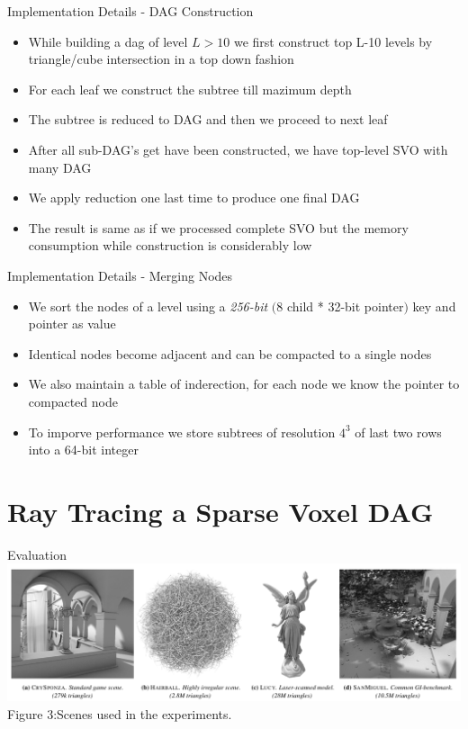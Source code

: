 \documentclass{beamer}
\begin{document}
\begin{frame}{Implementation Details - DAG Construction}
\begin{itemize}
\item{While building a dag of level $L>10$ we first construct top L-10 levels by triangle/cube intersection in a top down fashion}
\item{For each leaf we construct the subtree till mazimum depth}
\item{The subtree is reduced to DAG and then we proceed to next leaf}
\item{After all sub-DAG's get have been constructed, we have top-level SVO with many DAG}
\item{We apply reduction one last time to produce one final DAG}
\item{The result is same as if we processed complete SVO but the memory consumption while construction is considerably low}
\end{itemize}
\end{frame}

\begin{frame}{Implementation Details - Merging Nodes}
\begin{itemize}
\item{We sort the nodes of a level using a \textit{256-bit} $($8 child * 32-bit pointer$)$ key and pointer as value}
\item{Identical nodes become adjacent and can be compacted to a single nodes}
\item{We also maintain a table of inderection, for each node we know the pointer to compacted node}
\item{To imporve performance we store subtrees of resolution $4^3$ of last two rows into a 64-bit integer}
\end{itemize}
\end{frame}

\section{Ray Tracing a Sparse Voxel DAG}

\begin{frame}{Evaluation}
	\includegraphics[scale=0.26]{images/scenes.png}{\\Figure 3:Scenes used in the experiments.}
\end{frame}
\end{document}
